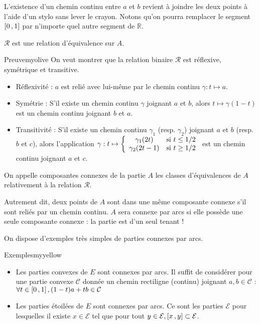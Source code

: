     L’existence d’un chemin continu entre $a$ et $b$ revient à joindre les deux points à l’aide d’un stylo sans lever le crayon. Notons qu’on pourra remplacer le segment $\left[ 0 \, , 1 \right]$ par n’importe quel autre segment de $\mathbb{R}$.

    \begin{prop}{}{}
        $\mathcal{R}$ est une relation d’équivalence sur $A$.
    \end{prop}

    \begin{demo}{Preuve}{myolive}
        On veut montrer que la relation binaire $\mathcal{R}$ est réflexive, symétrique et transitive.
        \begin{itemize}
            \item Réflexivité : $a$ est relié avec lui-même par le chemin continu $\gamma : t \mapsto a$.
            \item Symétrie : S’il existe un chemin continu $\gamma$ joignant $a$ et $b$, alors $t \mapsto \gamma(1-t)$ est un chemin continu joignant $b$ et $a$.
            \item Transitivité : S’il existe un chemin continu $\gamma_1$ (resp. $\gamma_2$) joignant $a$ et $b$ (resp. $b$ et $c$), alors l’application $\gamma : t \mapsto \sisi{\gamma_1(2t)}{t \leq 1/2}{\gamma_2(2t-1)}{t \geq 1/2}$ est un chemin continu joignant $a$ et $c$.
        \end{itemize}
    \end{demo}

    \begin{defi}{}{}
        On appelle composantes connexes de la partie $A$ les classes d’équivalences de $A$ relativement à la relation $\mathcal{R}$.
    \end{defi}

    Autrement dit, deux points de $A$ sont dans une même composante connexe s’il sont reliés par un chemin continu. $A$ sera connexe par arcs si elle possède une seule composante connexe : la partie est d’un seul tenant !

    On dispose d’exemples très simples de parties connexes par arcs.
    \begin{omed}{Exemples}{myyellow}
        \begin{itemize}
            \item Les parties convexes de $E$ sont connexes par arcs. Il suffit de considérer pour une partie convexe $\mathcal{C}$ donnée un chemin rectiligne (continu) joignant $a,b \in \mathcal{C}$ : $\forall t \in \left[ 0 \, , 1 \right], (1-t)a + tb \in \mathcal{C}$
            \item Les parties étoilées de $E$ sont connexes par arcs. Ce sont les parties $\mathcal{E}$ pour lesquelles il existe $x \in \mathcal{E}$ tel que pour tout $y \in \mathcal{E}, \left[ x \, , y \right] \subset \mathcal{E}$.
        \end{itemize}
    \end{omed}

